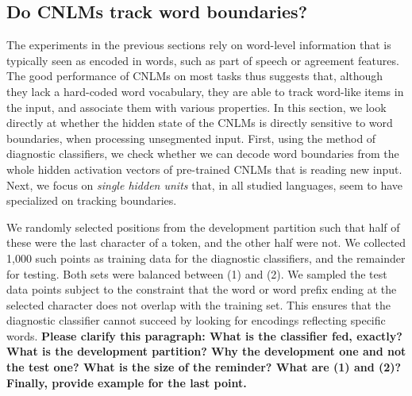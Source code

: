 \subsection{Do CNLMs track word boundaries?}
\label{sec:segmentation}


The experiments in the previous sections rely on word-level
information that is typically seen as encoded in words, such as part
of speech or agreement features. The good performance of CNLMs on most
tasks thus suggests that, although they lack a hard-coded word
vocabulary, they are able to track word-like items in the input, and
associate them with various properties. In this section, we look
directly at whether the hidden state of the CNLMs is directly
sensitive to word boundaries, when processing unsegmented
input. First, using the method of diagnostic classifiers, we check
whether we can decode word boundaries from the whole hidden activation
vectors of pre-trained CNLMs that is reading new input. Next, we
focus on \emph{single hidden units} that, in all studied languages,
seem to have specialized on tracking boundaries.

We randomly selected positions from the development partition such
that half of these were the last character of a token, and the other
half were not.  We collected 1,000 such points as training data for
the diagnostic classifiers, and the remainder for testing.  Both sets
were balanced between (1) and (2).  We sampled the test data points
subject to the constraint that the word or word prefix ending at the
selected character does not overlap with the training set.  This
ensures that the diagnostic classifier cannot succeed by looking for
encodings reflecting specific words. \textbf{Please clarify this
  paragraph: What is the classifier fed, exactly? What is the
  development partition? Why the development one and not the test one?
  What is the size of the reminder? What are (1) and (2)? Finally,
  provide example for the last point.}

